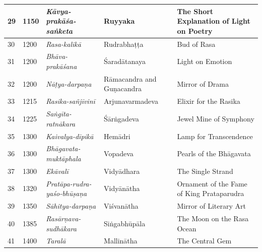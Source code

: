 \begin{longtable}{|l|p{1.1cm}|p{1.98cm}|p{1.98cm}|p{1.98cm}|}
\hline
29 & 1150 & \textit{Kāvya-prakāśa-saṅketa}\index{Kavyaprakasasanketa@\textit{Kāvya-prakāśa-saṅketa}} & Ruyyaka & The Short Explanation of Light on Poetry \\
\hline
30 & 1200 & \textit{Rasa-kalikā}\index{Rasakalika@\textit{Rasa-kalikā}} & Rudrabhaṭṭa\index{Rudrabhatta@Rudrabhaṭṭa} & Bud of Rasa\index{rasa@\textit{rasa}} \\
\hline
31 & 1200 & \textit{Bhāva-prakāśana}\index{Bhavaprakasana@\textit{Bhāva-prakāśana}} & Śaradātanaya\index{Saradatanaya@Śaradā-tanaya} & Light on Emotion \\
\hline
32 & 1200 & \textit{Nāṭya-darpaṇa}\index{Natyadarpana@\textit{Nāṭya-darpaṇa}} & Rāmacandra\index{Ramacandra@Rāmacandra} and Guṇacandra\index{Gunacandra@Guṇacandra} & Mirror of Drama \\
\hline
33 & 1215 & \textit{Rasika-sañjīvinī}\index{Rasikasanjivini@\textit{Rasika-sañjīvinī}} & Arjunavarma\-deva\index{Arjunavarmadeva} & Elixir for the Rasika\index{rasika@\textit{rasika}} \\
\hline
34 & 1225 & \textit{Saṅgīta-ratnākara}\index{Sangitaratnakara@\textit{Saṅgīta-ratnākara}} & Śārṅgadeva\index{Sarngadeva@Śārṅgadeva} & Jewel Mine of Symphony \\
\hline
35 & 1300 & \textit{Kaivalya-dīpikā}\index{Kaivalyadipika@\textit{Kaivalya-dīpikā}} & Hemādri\index{Hemadri@Hemādri} & Lamp for Transcendence \\
\hline
36 & 1300 & \textit{Bhāgavata-muktāphala}\index{Bhagavatamuktaphala@\textit{Bhāgavata-muktāphala}} & Vopadeva & Pearls of the Bhāgavata \\
\hline
37 & 1300 & \textit{Ekāvalī}\index{Ekavali@\textit{Ekāvalī}} & Vidyādhara & The Single Strand \\
\hline
38 & 1320 & \textit{Pratāpa-rudra-yaśo-bhūṣaṇa}\index{Prataparudrayasobhusana@\textit{Pratāparudra-yaśobhūṣaṇa}} & Vidyānātha & Ornament of the Fame of King Prataparudra \\
\hline
39 & 1350 & \textit{Sāhitya-darpaṇa}\index{Sahityadarpana@\textit{Sāhitya-darpaṇa}} & Viśvanātha & Mirror of Literary Art \\
\hline
40 & 1385 & \textit{Rasārṇava-sudhākara}\index{Rasarnavasudhakara@\textit{Rasārṇava-sudhākara}} & Siṅgabhūpāla\index{Singabhupala@Siṅgabhūpāla} & The Moon on the Rasa\index{rasa@\textit{rasa}} Ocean \\
\hline
41 & 1400 & \textit{Taralā}\index{Tarala@\textit{Taralā}} & Mallinātha\index{Mallinatha@Mallinātha} & The Central Gem \\

\end{longtable}
